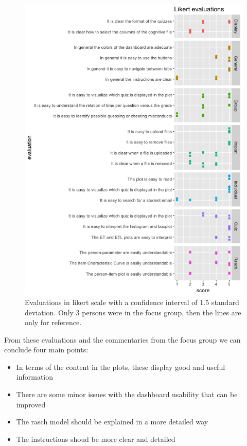 \begin{figure}[ht!]
\centering
\includegraphics[width=\linewidth]{img/likert.png}
\caption{Evaluations in likert scale with a confidence interval of 1.5 standard deviation. Only 3 persons were in the focus group, then the lines are only for reference.}
\label{img:likert}
\end{figure}


From these evaluations and the commentaries from the focus group we can conclude four main points:
  
  \begin{itemize}
\item{In terms of the content in the plots, these display good and useful information} 
\item{There are some minor issues with the dashboard usability that can be improved}
\item{The rasch model should be explained in a more detailed way}
\item{The instructions shoud be more clear and detailed}
\end{itemize}

